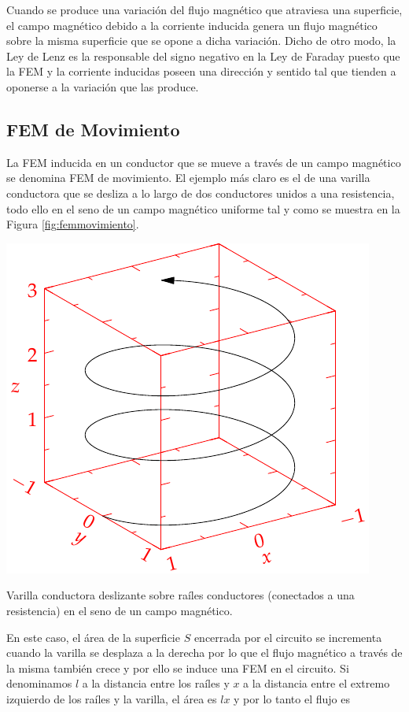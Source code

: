 \documentclass{tufte-handout}
\begin{document}
Cuando se produce una variación del flujo magnético que atraviesa una superficie, el campo magnético debido a la corriente inducida genera un flujo magnético sobre la misma superficie que se opone a dicha variación. Dicho de otro modo, la Ley de Lenz es la responsable del signo negativo en la Ley de Faraday puesto que la FEM y la corriente inducidas poseen una dirección y sentido tal que tienden a oponerse a la variación que las produce.

\subsection{FEM de Movimiento}

La FEM inducida en un conductor que se mueve a través de un campo magnético se denomina FEM de movimiento. El ejemplo más claro es el de una varilla conductora que se desliza a lo largo de dos conductores unidos a una resistencia, todo ello en el seno de un campo magnético uniforme tal y como se muestra en la Figura \ref{fig:femmovimiento}.

\begin{marginfigure}%
    \includegraphics[width=\linewidth]{helix}
    \caption{Varilla conductora deslizante sobre raíles conductores (conectados a una resistencia) en el seno de un campo magnético.}
    \label{fig:femmovimiento}
\end{marginfigure}

En este caso, el área de la superficie $S$ encerrada por el circuito se incrementa cuando la varilla se desplaza a la derecha por lo que el flujo magnético a través de la misma también crece y por ello se induce una FEM en el circuito. Si denominamos $l$ a la distancia entre los raíles y $x$ a la distancia entre el extremo izquierdo de los raíles y la varilla, el área es $lx$ y por lo tanto el flujo es
\end{document}
